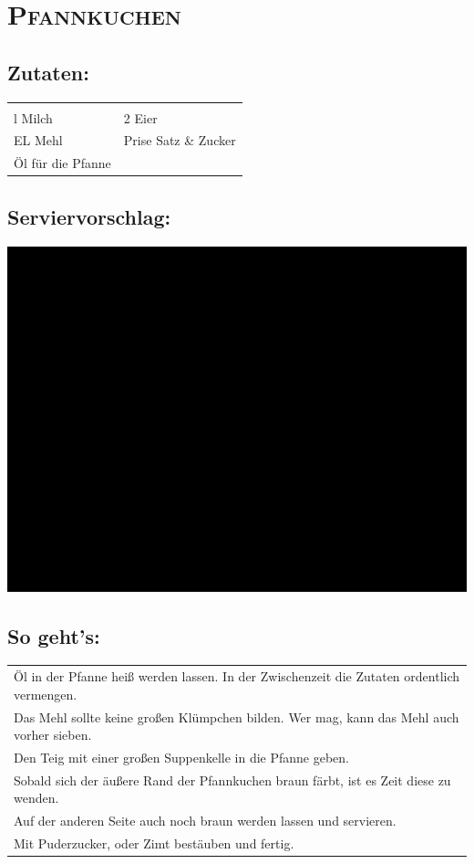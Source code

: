 \section{\textsc{Pfannkuchen}}

\subsection*{Zutaten:}

\begin{tabular}{p{7.5cm} p{7.5cm}}
	& \\
	\sfrac{1}{4}l Milch & 2 Eier \\
	EL Mehl & Prise Satz \& Zucker \\
  Öl für die Pfanne
\end{tabular}

\subsection*{Serviervorschlag:}

\includegraphics[width=\textwidth]{img/ph.jpg} \cite{pfannkuchen}

\subsection*{So geht's:}

\begin{tabular}{p{15cm}}
	\\
  Öl in der Pfanne heiß werden lassen. In der Zwischenzeit die Zutaten ordentlich vermengen.\\
  Das Mehl sollte keine großen Klümpchen bilden. Wer mag, kann das Mehl auch vorher sieben.\\
  Den Teig mit einer großen Suppenkelle in die Pfanne geben.\\
  Sobald sich der äußere Rand der Pfannkuchen braun färbt, ist es Zeit diese zu wenden. \\
  Auf der anderen Seite auch noch braun werden lassen und servieren.\\
  Mit Puderzucker, oder Zimt bestäuben und fertig.
\end{tabular}
